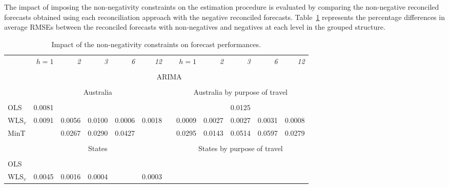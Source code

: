 \documentclass[11pt]{article}
\newcommand{\0}{\phantom{0}}
\begin{document}
The impact of imposing the non-negativity constraints on the estimation procedure is evaluated by comparing the non-negative reconciled forecasts obtained using each reconciliation approach with the negative reconciled forecasts. Table~\ref{tbl:impactnn} represents the percentage differences in average RMSEs between the reconciled forecasts with non-negatives and negatives at each level in the grouped structure.

\begin{table}[p]
	\centering
	\fontsize{9}{12}\rm\tabcolsep=0.095cm
	\caption{Impact of the non-negativity constraints on forecast performances.}
	\label{tbl:impactnn}
	\begin{threeparttable}
		\begin{tabular}{lrrrrrrrrrrr}
			\toprule
			& \it{$h=1$} & \it{2} & \it{3} & \it{6} & \it{12} & & \it{$h=1$} & \it{2} & \it{3} & \it{6} & \it{12} \\\cline{2-6} \cline{8-12} \\[-0.3cm]
			& \multicolumn{11}{c}{ARIMA} \\
			\cline{2-12} \\[-0.3cm]
			& \multicolumn{5}{c}{Australia} & & \multicolumn{5}{c}{Australia by purpose of travel} \\
			\cline{2-6} \cline{8-12}\\[-0.3cm]
			OLS & 0.0081 & \bm{$-0.0138$} & \bm{$-0.0230$} & \bm{$-0.0094$} & \bm{$-0.0269$} & & \bm{$-0.0757$} & \bm{$-0.0503$} & 0.0125 & \bm{$-0.0065$} & \bm{$-0.0157$} \\
			WLS$_{v}$ & 0.0091 & 0.0056 & 0.0100 & 0.0006 & 0.0018 & & 0.0009 & 0.0027 & 0.0027 & 0.0031 & 0.0008 \\
			MinT & \bm{$-0.0090$} & 0.0267 & 0.0290 & 0.0427 & \bm{$-0.0222$} & & 0.0295 & 0.0143 & 0.0514 & 0.0597 & 0.0279 \\
			\cline{2-6} \cline{8-12}\\[-0.3cm]
			& \multicolumn{5}{c}{States} & & \multicolumn{5}{c}{States by purpose of travel} \\
			\cline{2-6} \cline{8-12}\\[-0.3cm]
			OLS & \bm{$-0.0560$} & \bm{$-0.0744$} & \bm{$-0.0543$} & \bm{$-0.0159$} & \bm{$-0.0904$} & & \bm{$-0.5054$} & \bm{$-0.8173$} & \bm{$-0.7670$} & \bm{$-0.8597$} & \bm{$-0.7745$} \\
			WLS$_{v}$ & 0.0045 & 0.0016 & 0.0004 & \bm{$-0.0077$} & 0.0003 & & \bm{$-0.0009$} & \bm{$-0.0004$} & \bm{$-0.0013$} & \bm{$-0.0023$} & \bm{$-0.0037$} \\

\end{tabular}
\end{threeparttable}
\end{table}
\end{document}
